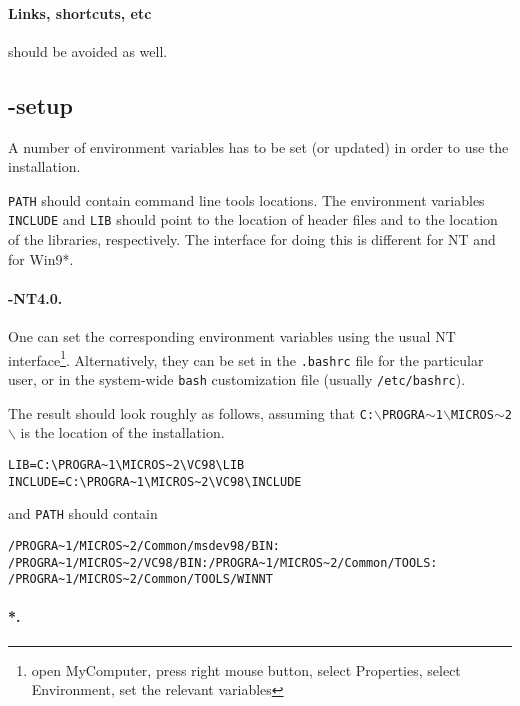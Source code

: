 \paragraph{Links, shortcuts, etc} should be avoided as well.

\subsection{\msvc{}-setup}

A number of environment variables has to be set (or updated)
in order to use the installation.

\texttt{PATH} should contain \msvc{} command line tools locations.
The environment variables \texttt{INCLUDE} and \texttt{LIB} should
point to the location of \msvc{} header files and to the location of
the \msvc{} libraries, respectively.  The interface for doing this is
different for NT and for Win9*.

\paragraph{\mswin-NT4.0.}

One can set the corresponding environment variables using the
usual NT interface\footnote{open MyComputer, press right mouse button,
  select Properties, select Environment, set the relevant variables}.
Alternatively, they can be set in the \texttt{.bashrc} file for the
particular user, or in the system-wide \texttt{bash} customization
file (usually \texttt{/etc/bashrc}).

The result should look roughly as follows, assuming that
\texttt{C:$\backslash$PROGRA$\sim$1$\backslash$MICROS$\sim$2$\backslash$}
is the location of the \msvc{} installation.
\begin{verbatim}
LIB=C:\PROGRA~1\MICROS~2\VC98\LIB
INCLUDE=C:\PROGRA~1\MICROS~2\VC98\INCLUDE
\end{verbatim}
and \texttt{PATH} should contain
\begin{verbatim}
/PROGRA~1/MICROS~2/Common/msdev98/BIN:
/PROGRA~1/MICROS~2/VC98/BIN:/PROGRA~1/MICROS~2/Common/TOOLS:
/PROGRA~1/MICROS~2/Common/TOOLS/WINNT
\end{verbatim}

\paragraph{*.} 

